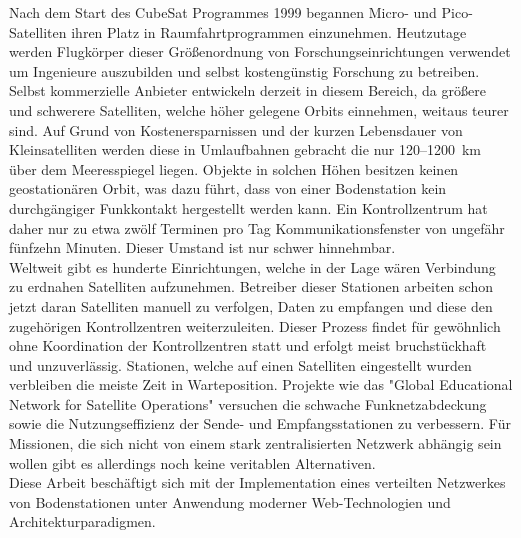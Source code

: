 Nach dem Start des CubeSat Programmes 1999 begannen Micro- und Pico-Satelliten  ihren Platz in Raumfahrtprogrammen einzunehmen. Heutzutage werden Flugkörper dieser Größenordnung von Forschungseinrichtungen verwendet um Ingenieure auszubilden und selbst kostengünstig Forschung zu betreiben. Selbst kommerzielle Anbieter entwickeln derzeit in diesem Bereich, da größere und schwerere Satelliten, welche höher gelegene Orbits einnehmen, weitaus teurer sind. Auf Grund von Kostenersparnissen und der kurzen Lebensdauer von Kleinsatelliten werden diese in Umlaufbahnen gebracht die nur 120--1200~km über dem Meeresspiegel liegen. Objekte in solchen Höhen besitzen keinen geostationären Orbit, was dazu führt, dass von einer Bodenstation kein durchgängiger Funkkontakt hergestellt werden kann. Ein Kontrollzentrum hat daher nur zu etwa zwölf Terminen pro Tag Kommunikationsfenster von ungefähr fünfzehn Minuten. Dieser Umstand ist nur schwer hinnehmbar. \\

Weltweit gibt es hunderte Einrichtungen, welche in der Lage wären Verbindung zu erdnahen Satelliten aufzunehmen. Betreiber dieser Stationen arbeiten schon jetzt daran Satelliten manuell zu verfolgen, Daten zu empfangen und diese den zugehörigen Kontrollzentren weiterzuleiten. Dieser Prozess findet für gewöhnlich ohne Koordination der Kontrollzentren statt und erfolgt meist bruchstückhaft und unzuverlässig. Stationen, welche auf einen Satelliten eingestellt wurden verbleiben die meiste Zeit in Warteposition. Projekte wie das "Global Educational Network for Satellite Operations" versuchen die schwache Funknetzabdeckung sowie die Nutzungseffizienz der Sende- und Empfangsstationen zu verbessern. Für Missionen, die sich nicht von einem stark zentralisierten Netzwerk abhängig sein wollen gibt es allerdings noch keine veritablen Alternativen. \\

Diese Arbeit beschäftigt sich mit der Implementation eines verteilten Netzwerkes von Bodenstationen unter Anwendung moderner Web-Technologien und Architekturparadigmen.